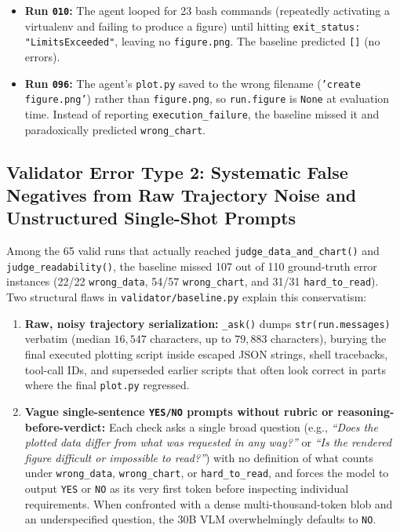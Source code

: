 \documentclass[11pt]{article}
\begin{document}
\begin{itemize}
\begin{itemize}
        \item \textbf{Run \texttt{010}:} The agent looped for 23 bash commands (repeatedly activating a virtualenv and failing to produce a figure) until hitting \texttt{exit\_status: "LimitsExceeded"}, leaving no \texttt{figure.png}. The baseline predicted \texttt{[]} (no errors).
        \item \textbf{Run \texttt{096}:} The agent's \texttt{plot.py} saved to the wrong filename (\texttt{'create figure.png'}) rather than \texttt{figure.png}, so \texttt{run.figure} is \texttt{None} at evaluation time. Instead of reporting \texttt{execution\_failure}, the baseline missed it and paradoxically predicted \texttt{wrong\_chart}.
    \end{itemize}
\end{itemize}

\subsection{Validator Error Type 2: Systematic False Negatives from Raw Trajectory Noise and Unstructured Single-Shot Prompts}
Among the 65 valid runs that actually reached \texttt{judge\_data\_and\_chart()} and \texttt{judge\_readability()}, the baseline missed 107 out of 110 ground-truth error instances (22/22 \texttt{wrong\_data}, 54/57 \texttt{wrong\_chart}, and 31/31 \texttt{hard\_to\_read}). Two structural flaws in \texttt{validator/baseline.py} explain this conservatism:
\begin{enumerate}
    \item \textbf{Raw, noisy trajectory serialization:} \texttt{\_ask()} dumps \texttt{str(run.messages)} verbatim (median $16{,}547$ characters, up to $79{,}883$ characters), burying the final executed plotting script inside escaped JSON strings, shell tracebacks, tool-call IDs, and superseded earlier scripts that often look correct in parts where the final \texttt{plot.py} regressed.
    \item \textbf{Vague single-sentence \texttt{YES/NO} prompts without rubric or reasoning-before-verdict:} Each check asks a single broad question (e.g., \textit{``Does the plotted data differ from what was requested in any way?''} or \textit{``Is the rendered figure difficult or impossible to read?''}) with no definition of what counts under \texttt{wrong\_data}, \texttt{wrong\_chart}, or \texttt{hard\_to\_read}, and forces the model to output \texttt{YES} or \texttt{NO} as its very first token before inspecting individual requirements. When confronted with a dense multi-thousand-token blob and an underspecified question, the 30B VLM overwhelmingly defaults to \texttt{NO}.
\end{enumerate}
\end{document}
